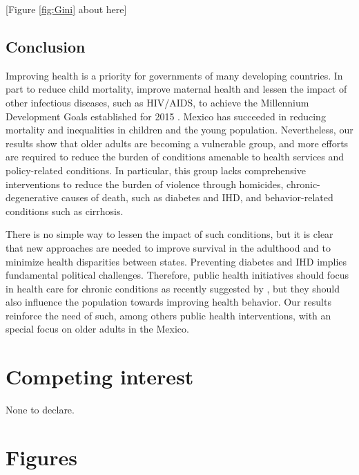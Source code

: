\documentclass[11.5pt]{article}
\begin{document}
\begin{spacing}{1.5}
\begin{center}
[Figure \ref{fig:Gini} about here]
\end{center}

\subsection*{Conclusion}
Improving health is a priority for governments of many developing countries. In part to reduce child mortality, improve maternal health and lessen the impact of other infectious diseases, such as HIV/AIDS, to achieve the Millennium Development Goals established for 2015 \citep{united2009millennium}.  Mexico has succeeded in reducing mortality and inequalities in children and the young population. Nevertheless, our results show that older adults are becoming a vulnerable group, and more efforts are required to reduce the burden of conditions amenable to health services and policy-related conditions. In particular, this group lacks comprehensive interventions to reduce the burden of violence through homicides, chronic-degenerative
causes of death, such as diabetes and IHD, and behavior-related conditions such as cirrhosis.  

There is no simple way to lessen the impact of such conditions, but it is clear that new approaches are needed to improve survival in the adulthood and to minimize health disparities between states. Preventing diabetes and IHD implies fundamental political challenges. Therefore,  public health initiatives should focus in health care for chronic conditions as recently suggested by \citet{knaul2015achieving}, but they should also influence the population towards improving health behavior. Our results reinforce the need of such, among others public health interventions, with an special focus on older adults in the Mexico. 

\section*{Competing interest}
None to declare.

\newpage

\section*{Figures}


\end{spacing}
\end{document}
